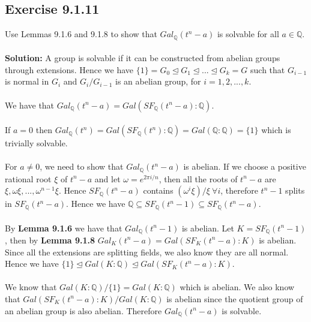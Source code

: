\documentclass{article}
\begin{document}
\subsection*{Exercise 9.1.11}
Use Lemmas 9.1.6 and 9.1.8 to show that $Gal_{\mathbb{Q}}(t^n - a)$ is solvable for all $a \in \mathbb{Q}$.
\\\\
\textbf{Solution:}
A group is solvable if it can be constructed from abelian groups through extensions.
Hence we have $\{1\} = G_0 \unlhd G_1 \unlhd ... \unlhd G_k = G$ such that $G_{i-1}$ is normal in $G_i$ and $G_{i} / G_{i-1}$
is an abelian group, for $i = 1, 2, ..., k$.
\\\\
We have that $Gal_{\mathbb{Q}}(t^n-a) = Gal(SF_{\mathbb{Q}}(t^n - a): \mathbb{Q})$.
\\\\
If $a=0$ then $Gal_{\mathbb{Q}}(t^n) = Gal(SF_{\mathbb{Q}}(t^n): \mathbb{Q}) = Gal(\mathbb{Q}: \mathbb{Q}) = \{1\}$ which is trivially solvable. 
\\\\
For $a \neq 0$, we need to show that $Gal_{\mathbb{Q}}(t^n-a)$ is abelian. If we choose a positive rational root $\xi$ of $t^n - a$ and let $\omega = e^{2\pi i /n}$, then
all the roots of $t^n - a$ are $\xi, \omega\xi, ..., \omega^{n-1}\xi$. Hence $SF_{\mathbb{Q}}(t^n - a)$ contains $(\omega^i\xi)/\xi \ \forall i$, therefore $t^n-1$ splits in $SF_{\mathbb{Q}}(t^n - a)$.
Hence we have $\mathbb{Q} \subseteq SF_{\mathbb{Q}}(t^n-1) \subseteq SF_{\mathbb{Q}}(t^n-a)$.
\\\\
By \textbf{Lemma 9.1.6} we have that $Gal_{\mathbb{Q}}(t^n-1)$ is abelian.  Let $K = SF_{\mathbb{Q}}(t^n-1)$, then by \textbf{Lemma 9.1.8} $Gal_K(t^n-a) = Gal(SF_K(t^n-a):K)$ is abelian.
Since all the extensions are splitting fields, we also know they are all normal.
Hence we have $\{1\} \unlhd Gal(K:\mathbb{Q}) \unlhd Gal(SF_{K}(t^n-a): K)$.
\\\\
We know that $Gal(K:\mathbb{Q})/\{ 1 \} = Gal(K:\mathbb{Q})$ which is abelian.
We also know that $Gal(SF_{K}(t^n-a):K)/Gal(K:\mathbb{Q})$ is abelian since the quotient group of an abelian group is also abelian.
Therefore $Gal_{\mathbb{Q}}(t^n - a)$  is solvable.
\end{document}
